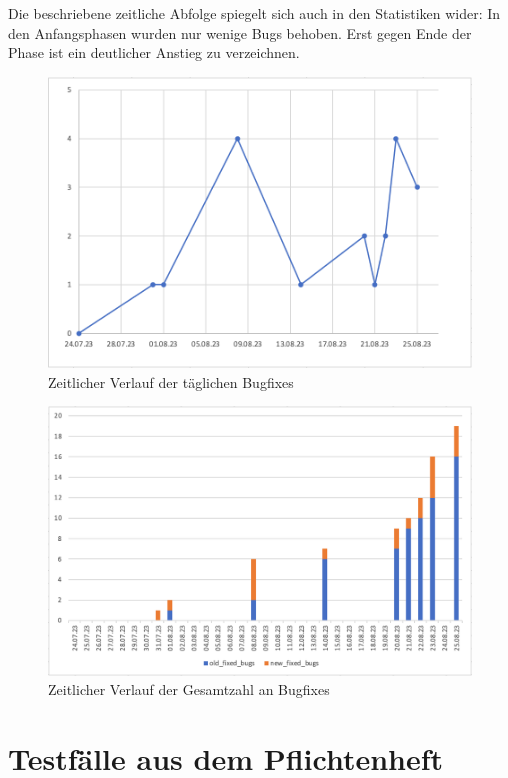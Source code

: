 \documentclass{article}
\begin{document}
Die beschriebene zeitliche Abfolge spiegelt sich auch in den Statistiken wider: In den Anfangsphasen wurden nur wenige Bugs behoben. Erst gegen Ende der Phase ist ein deutlicher Anstieg zu verzeichnen.

\begin{figure}[H]%
    \centering
    \includegraphics[width=12cm]{docs/qualityassurance/testreport/img/Overview_of_daily_fixed_bugs_over_time.png}
    \caption{Zeitlicher Verlauf der täglichen Bugfixes}
    \label{fig:sd:Overview_of_daily_fixed_bugs_over_time}
\end{figure}
\begin{figure}[H]%
    \centering
    \includegraphics[width=12cm]{docs/qualityassurance/testreport/img/Overview_of_total_fixed_bugs_over_time.png}
    \caption{Zeitlicher Verlauf der Gesamtzahl an Bugfixes}
    \label{fig:sd:Overview_of_total_fixed_bugs_over_time}
\end{figure}

\newpage
\section{Testfälle aus dem Pflichtenheft} \label{testfaelle}
\end{document}
